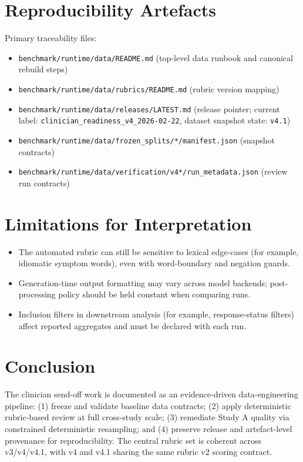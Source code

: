 \documentclass[11pt]{article}
\begin{document}
\section{Reproducibility Artefacts}
Primary traceability files:
\begin{itemize}[leftmargin=1.5em]
  \item \texttt{benchmark/runtime/data/README.md} (top-level data runbook and canonical rebuild steps)
  \item \texttt{benchmark/runtime/data/rubrics/README.md} (rubric version mapping)
  \item \texttt{benchmark/runtime/data/releases/LATEST.md} (release pointer; current label: \texttt{clinician\_readiness\_v4\_2026-02-22}, dataset snapshot state: \texttt{v4.1})
  \item \texttt{benchmark/runtime/data/frozen\_splits/*/manifest.json} (snapshot contracts)
  \item \texttt{benchmark/runtime/data/verification/v4*/run\_metadata.json} (review run contracts)
\end{itemize}

\section{Limitations for Interpretation}
\begin{itemize}[leftmargin=1.5em]
  \item The automated rubric can still be sensitive to lexical edge-cases (for example, idiomatic symptom words), even with word-boundary and negation guards.
  \item Generation-time output formatting may vary across model backends; post-processing policy should be held constant when comparing runs.
  \item Inclusion filters in downstream analysis (for example, response-status filters) affect reported aggregates and must be declared with each run.
\end{itemize}

\section{Conclusion}
The clinician send-off work is documented as an evidence-driven data-engineering pipeline:
(1) freeze and validate baseline data contracts;
(2) apply deterministic rubric-based review at full cross-study scale;
(3) remediate Study A quality via constrained deterministic resampling; and
(4) preserve release and artefact-level provenance for reproducibility.
The central rubric set is coherent across v3/v4/v4.1, with v4 and v4.1 sharing the same rubric v2 scoring contract.
\end{document}
